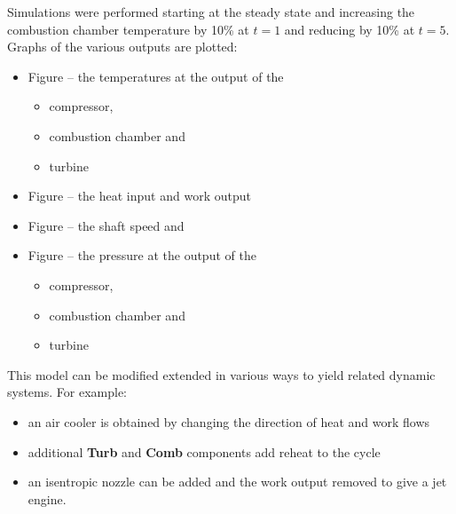 Simulations were performed starting at the steady state and increasing
the combustion chamber temperature by 10\% at $t=1$ and reducing by
10\% at $t=5$. Graphs of the various outputs are plotted:
\begin{itemize}
\item Figure
  -- the temperatures at the output of the
  \begin{itemize}
  \item compressor,
  \item combustion chamber and
  \item turbine
  \end{itemize}
\item Figure
  -- the heat input and work output
\item Figure
   -- the shaft speed and
\item Figure
  -- the pressure at the output of the
  \begin{itemize}
  \item compressor,
  \item combustion chamber and
  \item turbine
  \end{itemize}
\end{itemize}

This model can be modified extended in various ways to yield related
dynamic systems. For example:
\begin{itemize}
\item an air cooler is obtained by changing the direction of heat and
  work flows
\item additional \textbf{Turb} and \textbf{Comb} components add reheat
  to the cycle
\item an isentropic nozzle can be added and the work output removed
  to give a jet engine.
\end{itemize}


